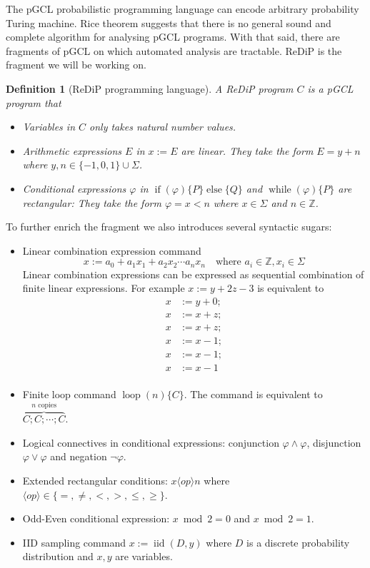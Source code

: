\documentclass[a4paper]{article}
\DeclareMathOperator*{\iid}{iid}
\newtheorem{definition}[theorem]{Definition}
\begin{document}
The pGCL probabilistic programming language can encode arbitrary probability Turing machine. Rice theorem suggests that there is no general sound and complete algorithm for analysing pGCL programs.
With that said, there are fragments of pGCL on which automated analysis are tractable. ReDiP is the fragment we will be working on.
\begin{definition}[ReDiP programming language]
	A ReDiP program \(C\) is a pGCL program that
	\begin{itemize}
		\item Variables in \(C\) only takes natural number values.
		\item Arithmetic expressions \(E\) in \(x:=E\) are linear.
		      They take the form \( E = y + n \)
		      where \( y,n \in \{-1,0,1\}\cup\Sigma \).
		\item Conditional expressions \(\varphi\) in
		      \(\operatorname{if}(\varphi)\{P\}\operatorname{else}\{Q\}\)
		      and
		      \(\operatorname{while}(\varphi)\{P\}\)
		      are rectangular:
		      They take the form \(\varphi = x < n\)
		      where \(x \in \Sigma\) and \(n \in \mathbb{Z}\).
	\end{itemize}
\end{definition}
To further enrich the fragment we also introduces several syntactic sugars:
\begin{itemize}
	\item Linear combination expression command
	      \[
		      x := a_0 + a_1 x_1 + a_2 x_2 \cdots a_n x_n
		      \quad
		      \text{where }
		      a_i \in \mathbb{Z},
		      x_i \in \Sigma
	      \]
	      Linear combination expressions can be expressed
	      as sequential combination of finite linear expressions.
	      For example \(x := y + 2z - 3\) is equivalent to
	      \[
		      \begin{aligned}
			      x & := y + 0; \\
			      x & := x + z; \\
			      x & := x + z; \\
			      x & := x - 1; \\
			      x & := x - 1; \\
			      x & := x - 1  \\
		      \end{aligned}
	      \]
	\item Finite loop command \(\operatorname{loop}(n)\{C\}\).
	      The command is equivalent to \(\overbrace{C;C;\cdots;C}^{n \text{ copies}}\).
	\item Logical connectives in conditional expressions: conjunction \(\varphi \land \varphi\), disjunction \(\varphi\lor\varphi\) and negation \(\lnot\varphi\).
	\item Extended rectangular conditions: \(x \langle op \rangle n\) where \(\langle op \rangle \in \{=,\neq,<,>,\leq,\geq\}\).
	\item Odd-Even conditional expression: \(x\bmod 2=0\) and \(x\bmod 2=1\).
	\item IID sampling command \(x := \iid(D,y)\) where \(D\) is a discrete probability distribution and \(x,y\) are variables.
\end{itemize}
\end{document}
